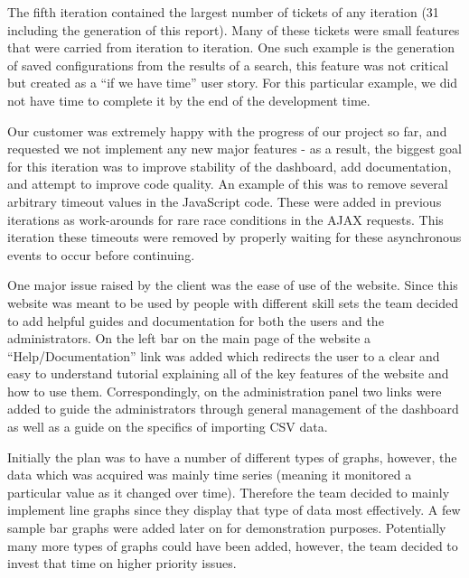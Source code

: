 \documentclass{l3proj}
\begin{document}
The fifth iteration contained the largest number of tickets of any iteration (31 including the generation of this report). Many of these tickets were small features that were carried from iteration to iteration. One such example is the generation of saved configurations from the results of a search, this feature was not critical but created as a ``if we have time'' user story. For this particular example, we did not have time to complete it by the end of the development time.

Our customer was extremely happy with the progress of our project so far, and requested we not implement any new major features - as a result, the biggest goal for this iteration was to improve stability of the dashboard, add documentation, and attempt to improve code quality. An example of this was to remove several arbitrary timeout values in the JavaScript code. These were added in previous iterations as work-arounds for rare race conditions in the AJAX requests. This iteration these timeouts were removed by properly waiting for these asynchronous events to occur before continuing.

One major issue raised by the client was the ease of use of the website. Since this website was meant to be used by people with different skill sets the team decided to add helpful guides and documentation for both the users and the administrators. On the left bar on the main page of the website a ``Help/Documentation'' link was added which redirects the user to a clear and easy to understand tutorial explaining all of the key features of the website and how to use them. Correspondingly, on the administration panel two links were added to guide the administrators through general management of the dashboard as well as a guide on the specifics of importing CSV data.

Initially the plan was to have a number of different types of graphs, however, the data which was acquired was mainly time series (meaning it monitored a particular value as it changed over time). Therefore the team decided to mainly implement line graphs since they display that type of data most effectively. A few sample bar graphs were added later on for demonstration purposes. Potentially many more types of graphs could have been added, however, the team decided to invest that time on higher priority issues.
\end{document}

